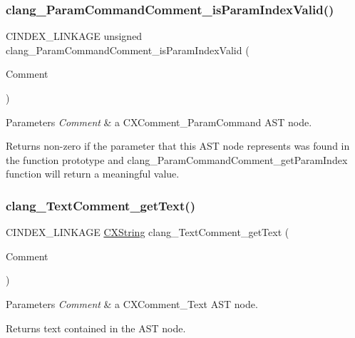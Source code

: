 \subsubsection{\texorpdfstring{clang\+\_\+\+Param\+Command\+Comment\+\_\+is\+Param\+Index\+Valid()}{clang\_ParamCommandComment\_isParamIndexValid()}}
{\footnotesize\ttfamily C\+I\+N\+D\+E\+X\+\_\+\+L\+I\+N\+K\+A\+GE unsigned clang\+\_\+\+Param\+Command\+Comment\+\_\+is\+Param\+Index\+Valid (\begin{DoxyParamCaption}\item[{\mbox{\hyperlink{structCXComment}{C\+X\+Comment}}}]{Comment }\end{DoxyParamCaption})}


\begin{DoxyParams}{Parameters}
{\em Comment} & a {\ttfamily C\+X\+Comment\+\_\+\+Param\+Command} A\+ST node.\\
\hline
\end{DoxyParams}
\begin{DoxyReturn}{Returns}
non-\/zero if the parameter that this A\+ST node represents was found in the function prototype and {\ttfamily clang\+\_\+\+Param\+Command\+Comment\+\_\+get\+Param\+Index} function will return a meaningful value. 
\end{DoxyReturn}
\mbox{\label{group__CINDEX__COMMENT_gae9a27e851356181beac36bbff6e638e2}} 
\subsubsection{\texorpdfstring{clang\+\_\+\+Text\+Comment\+\_\+get\+Text()}{clang\_TextComment\_getText()}}
{\footnotesize\ttfamily C\+I\+N\+D\+E\+X\+\_\+\+L\+I\+N\+K\+A\+GE \mbox{\hyperlink{structCXString}{C\+X\+String}} clang\+\_\+\+Text\+Comment\+\_\+get\+Text (\begin{DoxyParamCaption}\item[{\mbox{\hyperlink{structCXComment}{C\+X\+Comment}}}]{Comment }\end{DoxyParamCaption})}


\begin{DoxyParams}{Parameters}
{\em Comment} & a {\ttfamily C\+X\+Comment\+\_\+\+Text} A\+ST node.\\
\hline
\end{DoxyParams}
\begin{DoxyReturn}{Returns}
text contained in the A\+ST node. 
\end{DoxyReturn}
\mbox{\label{group__CINDEX__COMMENT_ga88371156eeeb768d0d14eb5630b7c726}} 
